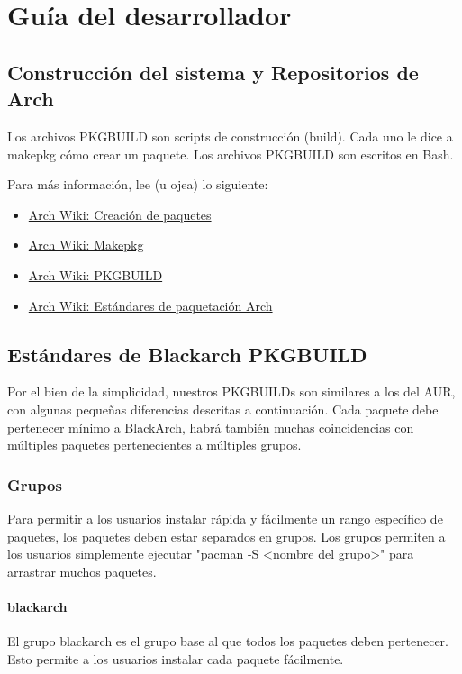 \documentclass[a4paper, oneside, 11pt]{book}
\def\href#1#2{\htmladdnormallink{#2}{#1}}
\begin{document}

\chapter{Guía del desarrollador}

\section{Construcción del sistema y Repositorios de Arch}

Los archivos PKGBUILD son scripts de construcción (build). Cada uno le dice a makepkg cómo crear un
paquete. Los archivos PKGBUILD son escritos en Bash.

Para más información, lee (u ojea) lo siguiente:
\begin{itemize}
\item \href{https://wiki.archlinux.org/index.php/Creating_Packages_(Espa%C3%B1ol)}{Arch Wiki: Creación de paquetes}
\item \href{https://wiki.archlinux.org/index.php/Makepkg_(Espa%C3%B1ol)}{Arch Wiki: Makepkg}
\item \href{https://wiki.archlinux.org/index.php/PKGBUILD_(Espa%C3%B1ol)}{Arch Wiki: PKGBUILD}
\item \href{https://wiki.archlinux.org/index.php/Arch_packaging_standards_(Espa%C3%B1ol)}{Arch Wiki: Estándares de paquetación Arch}
\end{itemize}

\section{Estándares de Blackarch PKGBUILD}
Por el bien de la simplicidad, nuestros PKGBUILDs son similares a los del AUR,
con algunas pequeñas diferencias descritas a continuación. Cada paquete debe
pertenecer mínimo a BlackArch, habrá también muchas coincidencias con
múltiples paquetes pertenecientes a múltiples grupos.

\subsection{Grupos}
Para permitir a los usuarios instalar rápida y fácilmente un rango específico de paquetes,
los paquetes deben estar separados en grupos. Los grupos permiten a los usuarios simplemente
ejecutar "pacman -S <nombre del grupo>" para arrastrar muchos paquetes.

\subsubsection{blackarch}
El grupo blackarch es el grupo base al que todos los paquetes deben pertenecer. Esto permite
a los usuarios instalar cada paquete fácilmente.
\end{document}
